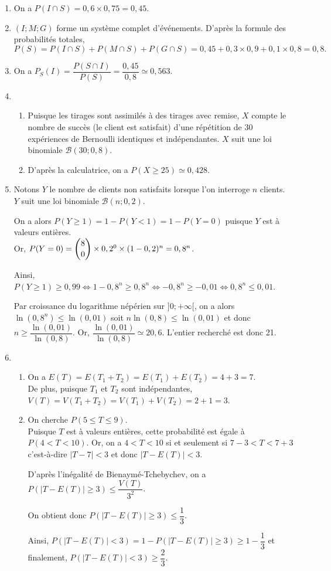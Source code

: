 \documentclass[11pt,fleqn, openany]{book} %
\begin{document}
\begin{solution}
\begin{enumerate}
\item On a $P(I \cap S)=0,6 \times 0,75 = 0,45$.

\item $(I;M;G)$ forme un système complet d'événements. D'après la formule des probabilités totales,
\[P(S)=P(I\cap S)+P(M\cap S)+P(G\cap S)=0,45+0,3 \times 0,9+0,1 \times 0,8 = 0,8.\]
\item On a $P_S(I)=\dfrac{P(S \cap I)}{P(S)}=\dfrac{0,45}{0,8}\simeq 0,563$.
\item \begin{enumerate}
\item Puisque les tirages sont assimilés à des tirages avec remise, $X$ compte le nombre de succès (le client est satisfait) d'une répétition de 30 expériences de Bernoulli identiques et indépendantes. $X$ suit une loi binomiale $\mathcal{B}\left(30;0,8\right)$.
\item D'après la calculatrice, on a $P(X \geqslant 25) \simeq 0,428$.
\end{enumerate}
\item Notons $Y$ le nombre de clients non satisfaits lorsque l'on interroge $n$ clients.\\ $Y$ suit une loi binomiale $\mathcal{B}(n;0,2)$.

On a alors $P(Y \geqslant 1)=1-P(Y <1)=1-P(Y=0)$ puisque $Y$ est à valeurs entières.\\ Or, $P(Y=0)=\dbinom{8}{0} \times 0,2 ^0 \times (1-0,2)^n=0,8^n$.

Ainsi, $P(Y \geqslant 1) \geqslant 0,99 \Leftrightarrow  1-0,8^n \geqslant 0,8^n \Leftrightarrow -0,8^n \geqslant -0,01 \Leftrightarrow 0,8^n \leqslant 0,01$.

Par croissance du logarithme népérien sur $]0;+\infty[$, on a alors $\ln(0,8^n) \leqslant \ln(0,01)$ soit $n\ln(0,8) \leqslant \ln(0,01)$ et donc $n \geqslant \dfrac{\ln(0,01)}{\ln(0,8)}$. Or, $\dfrac{\ln(0,01)}{\ln(0,8)}\simeq 20,6$. L'entier recherché est donc 21.
\item \begin{enumerate}
\item On a $E(T)=E(T_1+T_2)=E(T_1)+E(T_2)=4+3=7$.\\ De plus, puisque $T_1$ et $T_2$ sont indépendantes, $V(T)=V(T_1+T_2)=V(T_1)+V(T_2)=2+1=3$.
\item On cherche $P(5 \leqslant T \leqslant 9)$.\\ Puisque $T$ est à valeurs entières, cette probabilité est égale à $P(4<T<10)$. Or, on a $4<T<10$ si et seulement si $7-3<T<7+3$ c'est-à-dire $|T-7|<3$ et donc $|T-E(T)|<3$.

D'après l'inégalité de Bienaymé-Tchebychev, on a $P(|T-E(T)| \geqslant 3) \leqslant \dfrac{V(T)}{3^2}$.

On obtient donc $P(|T-E(T)| \geqslant 3) \leqslant \dfrac{1}{3}$.

Ainsi, $P(|T-E(T)|<3)=1-P(|T-E(T)| \geqslant 3) \geqslant 1- \dfrac{1}{3}$ et finalement, $P(|T-E(T)|<3) \geqslant \dfrac{2}{3}$.
\end{enumerate}
\end{enumerate}
\end{solution}
\end{document}
